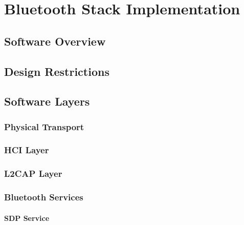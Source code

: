 \chapter{Bluetooth Stack Implementation}
\label{chp:btstackimp}


\section{Software Overview}


\section{Design Restrictions}


\section{Software Layers}


\FloatBarrier
\subsection{Physical Transport}


\FloatBarrier
\subsection{HCI Layer}


\FloatBarrier
\subsection{L2CAP Layer}


\FloatBarrier
\subsection{Bluetooth Services}


\FloatBarrier
\subsubsection{SDP Service}

